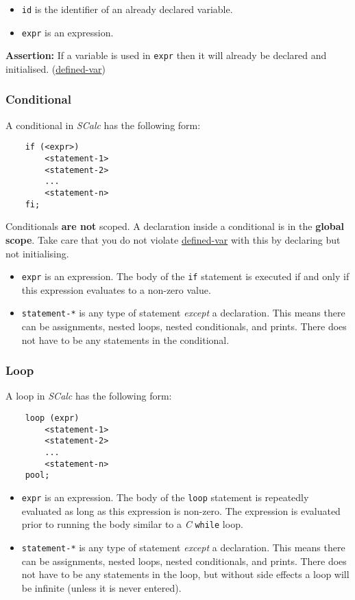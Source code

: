 \documentclass{article}
\newcommand{\code}[1]{\texttt{\textmd{#1}}}
\newcommand{\assertion}[2]{\textbf{Assertion: }#1 (\hyperlink{#2}{#2})}
\newcommand{\assertionref}[1]{\hyperlink{#1}{#1}}
\begin{document}
\begin{itemize}
	\item \code{id} is the identifier of an already declared variable.
	\item \code{expr} is an expression.
\end{itemize}

\assertion{If a variable is used in \code{expr} then it will already be declared and initialised.}
{defined-var}

\subsubsection{Conditional}
\label{sssec:conditional}
A conditional in \textit{SCalc} has the following form:
\begin{lstlisting}
	if (<expr>)
		<statement-1>
		<statement-2>
		...
		<statement-n>
	fi;
\end{lstlisting}

Conditionals \textbf{are not} scoped. A declaration inside a conditional is in the \textbf{global
scope}. Take care that you do not violate \assertionref{defined-var} with this by declaring but
not initialising.

\begin {itemize}
	\item
    \code{expr} is an expression. The body of the \code{if} statement is executed if and only if
    this expression evaluates to a non-zero value.
	\item
    \code{statement-*} is any type of statement \textit{except} a declaration. This means there can
    be assignments, nested loops, nested conditionals, and prints. There does not have to be any
    statements in the conditional.
\end{itemize}

\subsubsection{Loop}
\label{sssec:loop}
A loop in \textit{SCalc} has the following form:
\begin{lstlisting}
	loop (expr)
		<statement-1>
		<statement-2>
		...
		<statement-n>
	pool;
\end{lstlisting}

\begin {itemize}
	\item
  \code{expr} is an expression. The body of the \code{loop} statement is repeatedly evaluated as
  long as this expression is non-zero. The expression is evaluated prior to running the body
  similar to a \textit{C} \code{while} loop.
	\item
    \code{statement-*} is any type of statement \textit{except} a declaration. This means there can
    be assignments, nested loops, nested conditionals, and prints. There does not have to be any
    statements in the loop, but without side effects a loop will be infinite (unless it is never
    entered).
\end{itemize}
\end{document}
